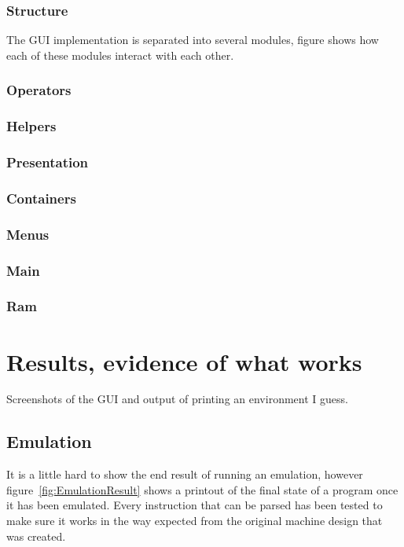 \documentclass[10point]{article}
\begin{document}
\subsubsection{Structure}

The GUI implementation is separated into several modules, figure shows how each of these modules interact with each other.

\subsubsection{Operators}

    
\subsubsection{Helpers}


\subsubsection{Presentation}


\subsubsection{Containers}


\subsubsection{Menus}

    
\subsubsection{Main}

    
\subsubsection{Ram}


\section{Results, evidence of what works}
Screenshots of the GUI and output of printing an environment I guess.

\subsection{Emulation}
It is a little hard to show the end result of running an emulation, however figure~\ref{fig:EmulationResult} shows a printout of the final state of a program once it has been emulated. Every instruction that can be parsed has been tested to make sure it works in the way expected from the original machine design that was created.
\end{document}
